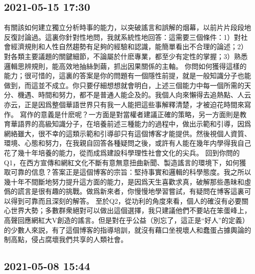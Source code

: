 \documentclass[twocolumn]{ctexart}
\begin{document}
\subsection*{2021-05-15 17:30}

有關該如何建立獨立分析時事的能力，以突破謠言和誤解的烟幕，以前片片段段地反復討論過。這裏你針對性地問，我就系統性地回答：這需要三個條件：1）對社會經濟規則和人性自然趨勢有足夠的經驗和認識，能簡單看出不合理的論述；2）對各類主要議題的關鍵細節，不論屬於什麽專業，都至少有定性的掌握；3）熟悉邏輯思辨規則，能高效地抽絲剝繭，抓出因果關係的主軸。
你問如何獲得這樣的能力；很可惜的，這裏的答案是你的問題有一個隱性前提，就是一般知識分子也能做到，而這並不成立。你只要仔細想想就會明白，上述三個能力中每一個所需的天分、機遇、時間和努力，都不是普通人能企及的。我個人向來懶得去追熱點、人云亦云，正是因爲整個華語世界只有我一人能把這些事解釋清楚，才被迫花時間來寫作。
寫作的意義是什麽呢？一方面是對當權者建議正確的策略，另一方面則是教育華語界的高級知識分子，在培養前述三種能力的過程中，做出示範和引導，因爲網絡雖大，很不幸的這類示範和引導卻只有這個博客才能提供。然後視個人資質、環境、心態和努力，在我親自回答各種疑問之後，或許有人能在幾年内學得我自己花了幾十年培養的能力，從而成爲建設科學理性社會文化的尖兵。
回到你問的Q1，在西方宣傳和網紅文化不斷有意無意扭曲新聞、製造謠言的環境下，如何獲取可靠的信息？答案正是這個博客的宗旨：堅持事實和邏輯的科學態度。我之所以幾十年不間斷地努力提升這方面的能力，是因爲天生喜歡求真，破解那些愚昧和虛僞的謊言是很有趣的挑戰。做爲新來者，你慢慢地學習嘗試，有疑問在博客這裏可以得到可靠而且深刻的解答。
至於Q2，從功利的角度來看，個人的確沒有必要關心世界大勢；多數群衆絕對可以做出這個選擇，我只建議他們不要站在笨蛋峰上，高聲回應網紅大V創造的謠言。但是對在乎公益（別忘了，這正是“好人”的定義）的少數人來説，有了這個博客的指導培訓，就沒有藉口坐視壞人和蠢蛋占據輿論的制高點，侵占腐壞我們共享的人類社會。
\subsection*{2021-05-08 15:44}
\end{document}
